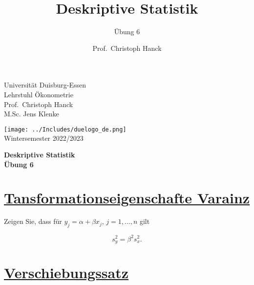 \documentclass[12pt,a4paper]{article}
\title{Deskriptive Statistik}
\subtitle{Übung 6}
\author{Prof.~Christoph Hanck}
\date{}
\newcommand{\tmpsection}[1]{}
\let\tmpsection=\section
\renewcommand{\section}[1]{\tmpsection{\underline{#1}} }
\begin{document}





\restoregeometry



\begin{minipage}{0.6\textwidth}
Universität Duisburg-Essen\\
Lehrstuhl Ökonometrie\\
Prof.~Christoph Hanck \\
M.Sc. Jens Klenke \\
\end{minipage}

	\begin{flushright}
	\vspace{-3.55cm}
	\texttt{[image: ../Includes/duelogo\_de.png]}\\
	\vspace{.125cm}
	Wintersemester 2022/2023
	\end{flushright}


\begin{center}
	\vspace{.25cm}
	\textbf{\Large{Deskriptive Statistik}}\\
	\vspace{.25cm}
	\textbf{\large{Übung 6}}\\
	\vspace{.125cm}
\end{center}





\hypertarget{tansformationseigenschafte-varainz}{%
\section{Tansformationseigenschafte
Varainz}\label{tansformationseigenschafte-varainz}}

Zeigen Sie, dass für \(y_j=\alpha+\beta x_j\), \(j=1,\ldots,n\) gilt

\begin{equation*}
  s_y^2 = \beta^2 s_x^2.
\end{equation*}

\hypertarget{verschiebungssatz}{%
\section{Verschiebungssatz}\label{verschiebungssatz}}
\end{document}
